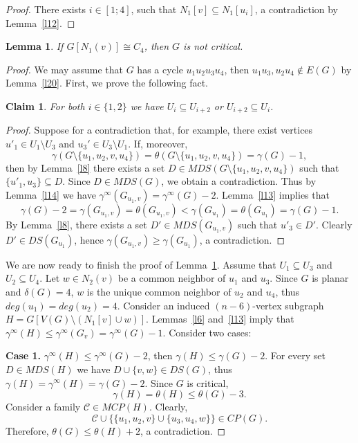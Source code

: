\documentclass[12pt]{article}
\newtheorem*{claim*}{Claim}
\newtheorem{lemma}{Lemma}
\begin{document}
\begin{proof}
There exists $i \in [1;4]$, such that $N_1[v] \subseteq N_1[u_i]$, a contradiction by Lemma~\ref{l12}.
\end{proof}

\begin{lemma}\label{l22}
If $G[N_1(v)] \cong C_4$, then $G$ is not critical.
\end{lemma}

\begin{proof}
We may assume that $G$ has a cycle $u_1u_2u_3u_4$, then $u_1u_3,u_2u_4 \notin E(G)$ by Lemma~\ref{l20}. First, we prove the following fact.

\begin{claim*} For both $i \in \{1,2\}$ we have $U_i \subseteq U_{i+2}$ or $U_{i+2} \subseteq U_i$.
\end{claim*}

\begin{proof}
Suppose for a contradiction that, for example, there exist vertices $u'_1 \in U_1 \setminus U_3$ and $u_3' \in U_3 \setminus U_1$.  If, moreover, $$\gamma(G \setminus \{u_1,u_2,v,u_4\}) =  \theta(G \setminus \{u_1,u_2,v,u_4\}) = \gamma(G) - 1,$$ then by Lemma~\ref{l8} there exists a set $D \in MDS(G \setminus \{u_1,u_2,v,u_4\})$ such that $\{u'_1,u_3\} \subseteq D$. Since $D \in MDS(G)$, we obtain a contradiction. Thus by Lemma~\ref{l14} we have $\gamma^{\infty}(G_{u_1,v}) = \gamma^{\infty}(G) - 2$. Lemma~\ref{l13} implies that $$\gamma(G) - 2 = \gamma(G_{u_1,v}) = \theta(G_{u_1,v}) < \gamma(G_{u_1}) = \theta(G_{u_1}) = \gamma(G) - 1.$$ By Lemma~\ref{l8}, there exists a set  $D' \in MDS(G_{u_1,v})$ such that $u'_3 \in D'$. Clearly $D' \in DS(G_{u_1})$, hence $\gamma(G_{u_1,v}) \geq \gamma(G_{u_1})$, a contradiction. 
\end{proof}

We are now ready to finish the proof of Lemma~\ref{l22}. Assume that $U_1 \subseteq U_3$ and $U_2 \subseteq U_4$. Let $w \in N_2(v)$ be a common neighbor of $u_1$ and $u_3$. Since $G$ is planar and $\delta(G) = 4$, $w$ is the unique common neighbor of $u_2$ and $u_4$, thus $deg(u_1) = deg(u_2) = 4$.  Consider an induced $(n-6)$-vertex subgraph $H = G[V(G) \setminus (N_1[v] \cup w)]$. Lemmas~\ref{l6} and~\ref{l13} imply that $\gamma^{\infty}(H) \leq \gamma^{\infty}(G_v) = \gamma^{\infty}(G) - 1$. Consider two cases:
 

\textbf{Case 1.} $\gamma^{\infty}(H) \leq \gamma^{\infty}(G) - 2$, then $\gamma(H) \leq \gamma(G) - 2$. For every set $D \in MDS(H)$ we have $D \cup \{v,w\} \in DS(G)$, thus $\gamma(H) = \gamma^{\infty}(H) = \gamma(G) - 2$. Since $G$ is critical, $$\gamma(H) = \theta(H) \leq \theta(G) - 3.$$ Consider a family $\mathcal{C} \in MCP(H)$. Clearly, $$\mathcal{C} \cup \{\{u_1,u_2,v\} \cup \{u_3,u_4,w\}\} \in CP(G).$$  Therefore, $\theta(G) \leq \theta(H) + 2$, a contradiction.


\end{proof}
\end{document}
